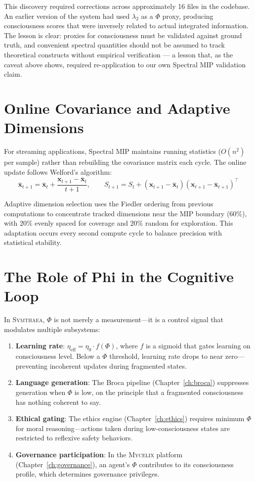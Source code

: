 \documentclass[12pt]{book}
\newcommand{\symthaea}{\textsc{Symthaea}}
\newcommand{\mycelix}{\textsc{Mycelix}}
\begin{document}
This discovery required corrections across approximately 16 files in the codebase. An earlier version of the system had used $\lambda_2$ as a $\Phi$ proxy, producing consciousness scores that were inversely related to actual integrated information. The lesson is clear: proxies for consciousness must be validated against ground truth, and convenient spectral quantities should not be assumed to track theoretical constructs without empirical verification --- a lesson that, as the caveat above shows, required re-application to our own Spectral MIP validation claim.

\section{Online Covariance and Adaptive Dimensions}

For streaming applications, Spectral MIP maintains running statistics ($O(n^2)$ per sample) rather than rebuilding the covariance matrix each cycle. The online update follows Welford's algorithm:
\begin{equation}
\bar{\mathbf{x}}_{t+1} = \bar{\mathbf{x}}_t + \frac{\mathbf{x}_{t+1} - \bar{\mathbf{x}}_t}{t+1}, \qquad S_{t+1} = S_t + (\mathbf{x}_{t+1} - \bar{\mathbf{x}}_t)(\mathbf{x}_{t+1} - \bar{\mathbf{x}}_{t+1})^\top
\end{equation}

Adaptive dimension selection uses the Fiedler ordering from previous computations to concentrate tracked dimensions near the MIP boundary (60\%), with 20\% evenly spaced for coverage and 20\% random for exploration. This adaptation occurs every second compute cycle to balance precision with statistical stability.

\section{The Role of Phi in the Cognitive Loop}

In \symthaea{}, $\Phi$ is not merely a measurement---it is a control signal that modulates multiple subsystems:

\begin{enumerate}
  \item \textbf{Learning rate}: $\eta_{\text{eff}} = \eta_0 \cdot f(\Phi)$, where $f$ is a sigmoid that gates learning on consciousness level. Below a $\Phi$ threshold, learning rate drops to near zero---preventing incoherent updates during fragmented states.
  \item \textbf{Language generation}: The Broca pipeline (Chapter~\ref{ch:broca}) suppresses generation when $\Phi$ is low, on the principle that a fragmented consciousness has nothing coherent to say.
  \item \textbf{Ethical gating}: The ethics engine (Chapter~\ref{ch:ethics}) requires minimum $\Phi$ for moral reasoning---actions taken during low-consciousness states are restricted to reflexive safety behaviors.
  \item \textbf{Governance participation}: In the \mycelix{} platform (Chapter~\ref{ch:governance}), an agent's $\Phi$ contributes to its consciousness profile, which determines governance privileges.
\end{enumerate}
\end{document}
